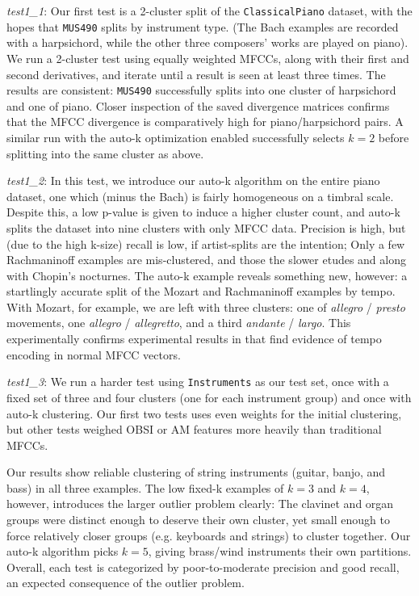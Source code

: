 \documentclass[12pt,twocolumn,titlepage]{article}
\begin{document}
\emph{test1\_1}: Our first test is a 2-cluster split of the \texttt{ClassicalPiano} dataset, with the hopes that \texttt{MUS490} splits by instrument type. (The Bach examples are recorded with a harpsichord, while the other three composers' works are played on piano). We run a 2-cluster test using equally weighted MFCCs, along with their first and second derivatives, and iterate until a result is seen at least three times. The results are consistent: \texttt{MUS490} successfully splits into one cluster of harpsichord and one of piano. Closer inspection of the saved divergence matrices confirms that the MFCC divergence is comparatively high for piano/harpsichord pairs. A similar run with the auto-k optimization enabled successfully selects $k = 2$ before splitting into the same cluster as above.

\emph{test1\_2}: In this test, we introduce our auto-k algorithm on the entire piano dataset, one which (minus the Bach) is fairly homogeneous on a timbral scale. Despite this, a low p-value is given to induce a higher cluster count, and auto-k splits the dataset into nine clusters with only MFCC data. Precision is high, but (due to the high k-size) recall is low, if artist-splits are the intention; Only a few Rachmaninoff examples are mis-clustered, and those the slower etudes and along with Chopin's nocturnes. The auto-k example reveals something new, however: a startlingly accurate split of the Mozart and Rachmaninoff examples by tempo. With Mozart, for example, we are left with three clusters: one of \emph{allegro} / \emph{presto} movements, one \emph{allegro} / \emph{allegretto}, and a third \emph{andante} / \emph{largo}. This experimentally confirms experimental results in \cite{LiChan} that find evidence of tempo encoding in normal MFCC vectors.

\emph{test1\_3}: We run a harder test using \texttt{Instruments} as our test set, once with a fixed set of three and four clusters (one for each instrument group) and once with auto-k clustering. Our first two tests uses even weights for the initial clustering, but other tests weighed OBSI or AM features more heavily than traditional MFCCs.

Our results show reliable clustering of string instruments (guitar, banjo, and bass) in all three examples. The low fixed-k examples of $k=3$ and $k=4$, however, introduces the larger outlier problem clearly: The clavinet and organ groups were distinct enough to deserve their own cluster, yet small enough to force relatively closer groups (e.g. keyboards and strings) to cluster together. Our auto-k algorithm picks $k=5$, giving brass/wind instruments their own partitions. Overall, each test is categorized by poor-to-moderate precision and good recall, an expected consequence of the outlier problem.
\end{document}
